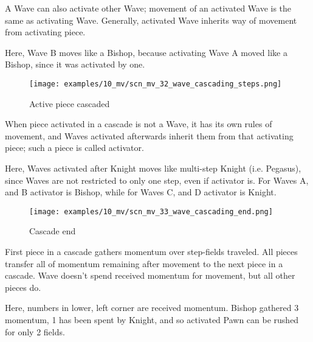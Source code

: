 A Wave can also activate other Wave; movement of an activated Wave is the same as
activating Wave. Generally, activated Wave inherits way of movement from activating
piece.

Here, Wave B moves like a Bishop, because activating Wave A moved like a Bishop,
since it was activated by one.

\clearpage %

\vspace*{-2.1\baselineskip}
\noindent
\begin{figure}[h]
\texttt{[image: examples/10\_mv/scn\_mv\_32\_wave\_cascading\_steps.png]}
\vspace*{-1.4\baselineskip}
\caption{Active piece cascaded}
\label{fig:scn_mv_32_wave_cascading_steps}
\end{figure}

\vspace*{-0.4\baselineskip}
When piece activated in a cascade is not a Wave, it has its own rules of movement, and
Waves activated afterwards inherit them from that activating piece; such a piece is
called activator.

Here, Waves activated after Knight moves like multi-step Knight (i.e. Pegasus), since
Waves are not restricted to only one step, even if activator is. For Waves A, and B
activator is Bishop, while for Waves C, and D activator is Knight.

\clearpage %

\vspace*{-2.1\baselineskip}
\noindent
\begin{figure}[h]
\texttt{[image: examples/10\_mv/scn\_mv\_33\_wave\_cascading\_end.png]}
\vspace*{-1.3\baselineskip}
\caption{Cascade end}
\label{fig:scn_mv_33_wave_cascading_end}
\end{figure}

\vspace*{-0.3\baselineskip}
First piece in a cascade gathers momentum over step-fields traveled. All pieces
transfer all of momentum remaining after movement to the next piece in a cascade.
Wave doesn't spend received momentum for movement, but all other pieces do.

Here, numbers in lower, left corner are received momentum. Bishop gathered 3 momentum,
1 has been spent by Knight, and so activated Pawn can be rushed for only 2 fields.


